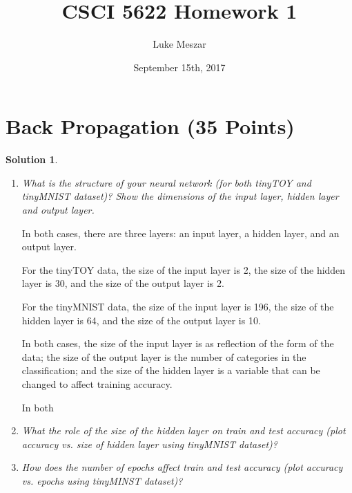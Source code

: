 \documentclass[12pt]{article}
\author{Luke Meszar}
\date{September 15th, 2017}
\title{CSCI 5622 Homework 1}
\theoremstyle{definition}
\newtheorem*{solution*}{Solution}
\begin{document}
	\thispagestyle{empty}
	
	\newlength{\boxlength}\setlength{\boxlength}{\textwidth}
	\addtolength{\boxlength}{-4mm}
	
	\begin{center}
	\end{center}
	\section{Back Propagation (35 Points)}																																									
	\begin{solution*}\leavevmode
		\begin{enumerate}[label=\arabic*.,font=\upshape]
			\item \textit{What is the structure of your neural network (for both tinyTOY and tinyMNIST dataset)?
				Show the dimensions of the input layer, hidden layer and output layer.}
			
			In both cases, there are three layers: an input layer, a hidden layer, and an output layer. 
			
			For the tinyTOY data, the size of the input layer is 2, the size of the hidden layer is 30, and the size of the output layer is 2.
			
			For the tinyMNIST data, the size of the input layer is 196, the size of the hidden layer is 64, and the size of the output layer is 10.
			
			In both cases, the size of the input layer is as reflection of the form of the data; the size of the output layer is the number of categories in the classification; and the size of the hidden layer is a variable that can be changed to affect training accuracy.
			
			In both 
			\item \textit{What the role of the size of the hidden layer on train and test accuracy (plot accuracy vs.
				size of hidden layer using tinyMNIST dataset)?}
			\item \textit{How does the number of epochs affect train and test accuracy (plot accuracy vs. epochs using
					tinyMINST dataset)?}
		\end{enumerate}
	\end{solution*}
\end{document}
